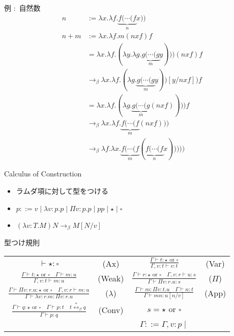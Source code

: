 \documentclass[18pt]{beamer}
\begin{document}
\begin{frame}{例 $\colon$ 自然数}
 \begin{align*}
 n & := \lambda x. \lambda f. \underbrace{f (\cdots (f}_{n} x)) \\
 n + m & := \lambda x. \lambda f. m (n x f) f \\
       & = \lambda x. \lambda f. (\lambda y. \lambda g. \underbrace{g (\cdots (g}_{m} y))) (n x f) f \\
       & \rightarrow_\beta \lambda x. \lambda f. (\lambda g. \underbrace{g (\cdots (g}_{m} y))[y/n x f]) f \\
       & = \lambda x. \lambda f. (\lambda g. \underbrace{g (\cdots (g}_{m} (n x f)))) f \\
       & \rightarrow_\beta \lambda x. \lambda f. \underbrace{f (\cdots (f}_{m} (n x f))) \\
       & \rightarrow_\beta \lambda f. \lambda x. \underbrace{f (\cdots (f}_{m} (\underbrace{f (\cdots (f}_{n} x)))))
 \end{align*}
\end{frame}

\begin{frame}{Calculus of Construction}
 \begin{itemize}
  \item ラムダ項に対して型をつける
  \item $p ::= v \mid \lambda v \colon p. p \mid \Pi v \colon p. p \mid p p \mid \star \mid \square$
  \item $(\lambda v \colon T. M) N \rightarrow_\beta M[N/v]$
 \end{itemize}
\end{frame}

\begin{frame}[fragile]{型つけ規則}
\begin{tabular}{cccc}
 $\vdash {\star} {\colon} {\square}$ & (Ax) & $\frac{\Gamma \vdash t {\colon} {\star} \text{ or } {\square}}{\Gamma, v \colon t \vdash v {\colon} t}$ & (Var) \\[30pt]
 $\frac{\Gamma \vdash t {\colon} {\star} \text{ or } \square \quad \Gamma \vdash m {\colon} u}{\Gamma, v \colon t \vdash m {\colon} u}$ & (Weak) & $\frac{\Gamma \vdash r {\colon} {\star} \text{ or } {\square} \quad \Gamma, v \colon r \vdash u {\colon} s}{\Gamma \vdash \Pi v \colon r. u {\colon} s}$ & ($\Pi$) \\[30pt]
 $\frac{\Gamma \vdash \Pi v \colon r. u {\colon} {\star} \text{ or } {\square} \quad \Gamma, v \colon r \vdash m : u}{\Gamma \vdash \lambda v \colon r. m {\colon} \Pi v \colon r. u}$ & ($\lambda$) & $\frac{\Gamma \vdash m : \Pi v \colon t. u \quad \Gamma \vdash n : t}{\Gamma \vdash m n {\colon} u[n/v]}$ & (App) \\[30pt]
 $\frac{\Gamma \vdash q {\colon} {\star} \text{ or } {\square} \quad \Gamma \vdash p {\colon} t \quad t \overset{*}{\leftrightarrow}_\beta q}{\Gamma \vdash p {\colon} q}$ & (Conv) & $s = {\star} \text{ or } {\square}$ & \\[30pt]
& & $\Gamma ::= \Gamma, v \colon p \mid$ & \\
\end{tabular}
\end{frame}
\end{document}
